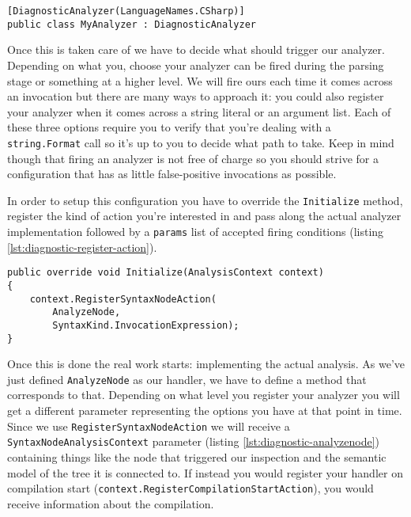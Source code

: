 \begin{lstlisting}[label={lst:diagnostic-supported-lang}]
[DiagnosticAnalyzer(LanguageNames.CSharp)]
public class MyAnalyzer : DiagnosticAnalyzer
\end{lstlisting}

Once this is taken care of we have to decide what should trigger our analyzer. Depending on what you, choose your analyzer can be fired during the parsing stage or something at a higher level. We will fire ours each time it comes across an invocation but there are many ways to approach it: you could also register your analyzer when it comes across a string literal or an argument list. Each of these three options require you to verify that you're dealing with a \texttt{string.Format} call so it's up to you to decide what path to take. Keep in mind though that firing an analyzer is not free of charge so you should strive for a configuration that has as little false-positive invocations as possible.

In order to setup this configuration you have to override the \texttt{Initialize} method, register the kind of action you're interested in and pass along the actual analyzer implementation followed by a \texttt{params} list of accepted firing conditions (listing \ref{lst:diagnostic-register-action}).

\begin{lstlisting}[label={lst:diagnostic-register-action}]
public override void Initialize(AnalysisContext context)
{
	context.RegisterSyntaxNodeAction(
		AnalyzeNode, 
		SyntaxKind.InvocationExpression);
}
\end{lstlisting}

Once this is done the real work starts: implementing the actual analysis. As we've just defined \texttt{AnalyzeNode} as our handler, we have to define a method that corresponds to that. Depending on what level you register your analyzer you will get a different parameter representing the options you have at that point in time. Since we use \texttt{RegisterSyntaxNodeAction} we will receive a \texttt{SyntaxNodeAnalysisContext} parameter (listing \ref{lst:diagnostic-analyzenode}) containing things like the node that triggered our inspection and the semantic model of the tree it is connected to. If instead you would register your handler on compilation start (\texttt{context.RegisterCompilationStartAction}), you would receive information about the compilation.

